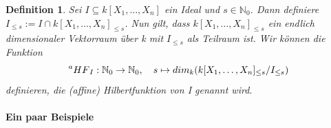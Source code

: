 \documentclass{article}
\newtheorem{definition}[satz]{Definition}
\newcommand*{\R}{k[X_{1},\ldots,X_{n}]}
\begin{document}
	\begin{definition} \label{1.2.11}
	Sei \(I \subseteq \R\) ein Ideal und \(s \in \mathbb{N}_{0}\). Dann definiere \(I_{\leq s} :=
	I \cap \R_{\leq s}\). Nun gilt, dass \(\R_{\leq s}\) ein endlich dimensionaler Vektorraum über
	k  mit \(I_{\leq s}\) als Teilraum ist. Wir können die Funktion \begin{displaymath}
	\prescript{a}{}{HF}_{I} : \mathbb{N}_{0} \rightarrow \mathbb{N}_{0}, \quad s \mapsto
	dim_{k}(\R_{\leq s}/I_{\leq s})	\end{displaymath} definieren, die (affine) Hilbertfunktion
	von I genannt wird.
	\end{definition}


	\paragraph{Ein paar Beispiele}
\end{document}
